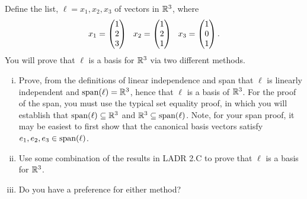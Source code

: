 \begin{question}
	\normalfont
	
	Define the list, $\ell=x_1,x_2,x_3$ \hspace{.1cm} of vectors in ${\mathbb R}^3$, where 
	\begin{align*}
		x_1 = \ColVecThree{1}{2}{3}\ \ 
		x_2 = \ColVecThree{1}{2}{1}\ \
		x_3 = \ColVecThree{1}{0}{1}.
	\end{align*}
	You will prove that $\ell$ is a basis for ${\mathbb R}^3$ via two different methods.
	\begin{enumerate}[(i)]
		\item Prove, from the definitions of linear independence and span that $\ell$ is linearly independent and $\textnormal{span}(\ell)={\mathbb R}^3$, hence that $\ell$ is a basis of ${\mathbb R}^3$.  For the proof of the span, you must use the typical set equality proof, in which you will establish that $\textnormal{span}(\ell)\subseteq {\mathbb R}^3$ and ${\mathbb R}^3\subseteq \textnormal{span}(\ell)$.  Note, for your span proof, it may be easiest to first show that the canonical basis vectors satisfy $e_1,e_2,e_3\in \textnormal{span}(\ell)$.
		
		\item Use some combination of the results in LADR 2.C to prove that $\ell$ is a basis for ${\mathbb R}^3$.
		
		\item Do you have a preference for either method?
		
	\end{enumerate}

\end{question}
